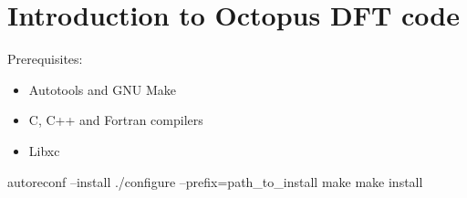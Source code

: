 \chapter{Introduction to \textsf{Octopus} DFT code}

Prerequisites:
\begin{itemize}
\item Autotools and GNU Make
\item C, C++ and Fortran compilers
\item Libxc
\end{itemize}

\begin{bashcode}
autoreconf --install
./configure --prefix=path_to_install
make
make install
\end{bashcode}

